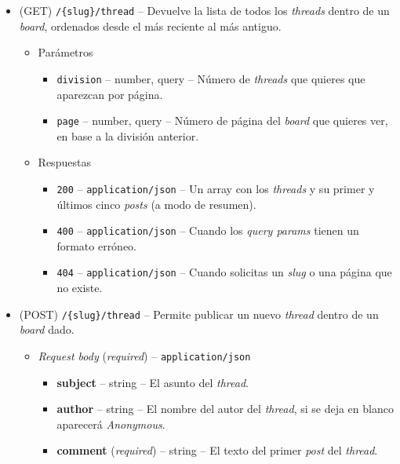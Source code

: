 \documentclass[12pt,a4paper,titlepage]{article}
\begin{document}
    \begin{itemize}
        \item (GET) \texttt{/\{slug\}/thread} -- Devuelve la lista de todos los \textit{threads} dentro de un \textit{board}, ordenados desde el más reciente al más antiguo.
        \begin{itemize}
            \item Parámetros
            \begin{itemize}
                \item \texttt{division} -- number, query -- Número de \textit{threads} que quieres que aparezcan por página.
                \item \texttt{page} -- number, query -- Número de página del \textit{board} que quieres ver, en base a la división anterior.
            \end{itemize}
        \end{itemize}
        \begin{itemize}
            \item Respuestas
            \begin{itemize}
                \item \texttt{200} -- \texttt{application/json} -- Un array con los \textit{threads} y su primer y últimos cinco \textit{posts} (a modo de resumen).
                \item \texttt{400} -- \texttt{application/json} -- Cuando los \textit{query params} tienen un formato erróneo.
                \item \texttt{404} -- \texttt{application/json} -- Cuando solicitas un \textit{slug} o una página que no existe.
            \end{itemize}
        \end{itemize}
        \item (POST) \texttt{/\{slug\}/thread} -- Permite publicar un nuevo \textit{thread} dentro de un \textit{board} dado.
        \begin{itemize}
            \item \textit{Request body} (\textit{required}) -- \texttt{application/json}
            \begin{itemize}
                \item \textbf{subject} -- string -- El asunto del \textit{thread}.
                \item \textbf{author} -- string -- El nombre del autor del \textit{thread}, si se deja en blanco aparecerá \textit{Anonymous}.
                \item \textbf{comment} (\textit{required}) -- string -- El texto del primer \textit{post} del \textit{thread}.

\end{itemize}
\end{itemize}
\end{itemize}
\end{document}
